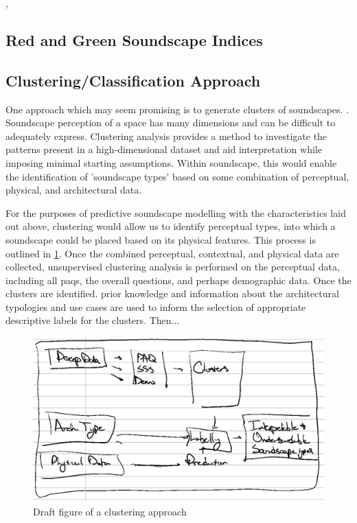 \citep{Verma2020Predicting}, \citep{Gasco2020Social}

\subsection{Red and Green Soundscape Indices}
\citep{Yang2022Effects,Kogan2018Green} 

\subsection{Clustering/Classification Approach}
One approach which may seem promising is to generate clusters of soundscapes. . Soundscape perception of a space has many dimensions and can be difficult to adequately express. Clustering analysis provides a method to investigate the patterns present in a high-dimensional dataset and aid interpretation while imposing minimal starting assumptions. Within soundscape, this would enable the identification of 'soundscape types' based on some combination of perceptual, physical, and architectural data. 

For the purposes of predictive soundscape modelling with the characteristics laid out above, clustering would allow us to identify perceptual types, into which a soundscape could be placed based on its physical features. This process is outlined in \cref{fig:clusterModel}. Once the combined perceptual, contextual, and physical data are collected, unsupervised clustering analysis is performed on the perceptual data, including all \gls{paq}s, the overall questions, and perhaps demographic data. Once the clusters are identified. prior knowledge and information about the architectural typologies and use cases are used to inform the selection of appropriate descriptive labels for the clusters. Then... %

\begin{figure}
  \includegraphics[width=\textwidth]{Figures/Remarkable clustering figure.jpg}
  \caption{Draft figure of a clustering approach}\label{fig:clusterModel}
\end{figure}

